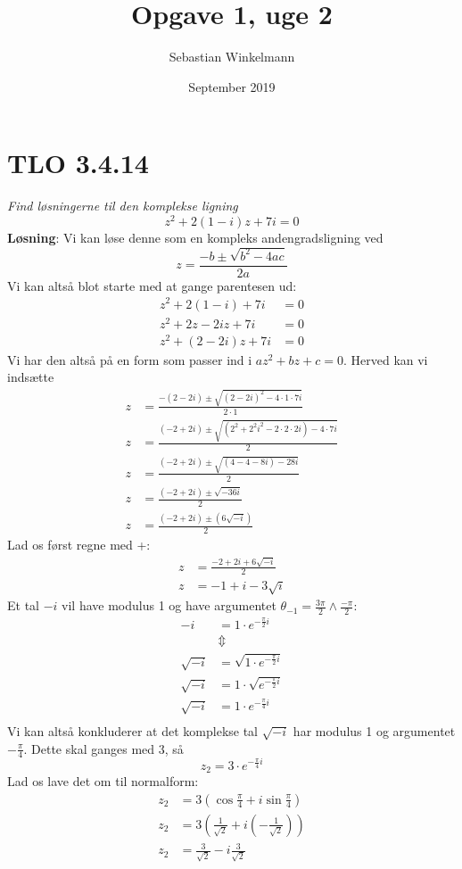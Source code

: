\documentclass{report}
\title{Opgave 1, uge 2}
\author{Sebastian Winkelmann}
\date{September 2019}
\begin{document}

\maketitle
\setcounter{chapter}{1}
\section{TLO 3.4.14}
\textit{Find løsningerne til den komplekse ligning}\begin{equation}
    z^2+2(1-i)z+7i=0
\end{equation}
\textbf{Løsning}: Vi kan løse denne som en kompleks andengradsligning ved $$z=\frac{-b\pm\sqrt{b^2-4ac}}{2a}$$
Vi kan altså blot starte med at gange parentesen ud:\begin{align}
    z^2+2(1-i)+7i&=0\\
    z^2+2z-2iz+7i&=0\\
    z^2+(2-2i)z+7i&=0
\end{align}
Vi har den altså på en form som passer ind i $az^2+bz+c=0$. Herved kan vi indsætte
\begin{align}
    z&=\frac{-(2-2i)\pm\sqrt{(2-2i)^2-4\cdot1\cdot7i}}{2\cdot1}\\
    z&=\frac{(-2+2i)\pm\sqrt{(2^2+2^2i^2-2\cdot2\cdot2i)-4\cdot7i}}{2}\\
    z&=\frac{(-2+2i)\pm\sqrt{(4-4-8i)-28i}}{2}\\
    z&=\frac{(-2+2i)\pm\sqrt{-36i}}{2}\\
    z&=\frac{(-2+2i)\pm(6\sqrt{-i})}{2}
\end{align}
Lad os først regne med +:\begin{align}
    z&=\frac{-2+2i+6\sqrt{-i}}{2}\\
    z&=-1+i-3\sqrt{i}
\end{align}
Et tal $-i$ vil have modulus 1 og have argumentet $\theta_{-1}=\frac{3\pi}{2}\land\frac{-\pi}{2}$:\begin{align*}
    -i&=1\cdot e^{-\frac{\pi}{2} i}\\
    &\Updownarrow\\
    \sqrt{-i}&=\sqrt{1\cdot e^{-\frac{\pi}{2} i}}\\
    \sqrt{-i}&=1\cdot\sqrt{e^{-\frac{\pi}{2} i}}\\
    \sqrt{-i}&=1\cdot e^{-\frac{\pi}{4} i}\\
\end{align*}
Vi kan altså konkluderer at det komplekse tal $\sqrt{-i}$ har modulus 1 og argumentet $-\frac{\pi}{4}$. Dette skal ganges med 3, så $$z_2=3\cdot e^{-\frac{\pi}{4}i}$$ Lad os lave det om til normalform:\begin{align*}
    z_2&=3\left(\cos{\frac{\pi}{4}+i\sin{\frac{\pi}{4}}}\right)\\
    z_2&=3\left(\frac{1}{\sqrt{2}}+i\left(-\frac{1}{\sqrt{2}}\right)\right)\\
    z_2&=\frac{3}{\sqrt{2}}-i\frac{3}{\sqrt{2}}
\end{align*}
\end{document}
